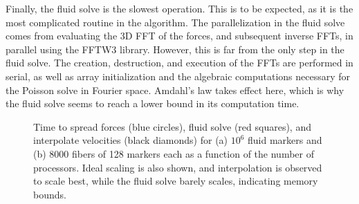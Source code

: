 \documentclass[]{article}
\begin{document}
Finally, the fluid solve is the slowest operation. This is to be expected, as it is the most complicated routine in the algorithm. The parallelization in the fluid solve comes from evaluating the 3D FFT of the forces, and subsequent inverse FFTs, in parallel using the FFTW3 library. However, this is far from the only step in the fluid solve. The creation, destruction, and execution of the FFTs are performed in serial, as well as array initialization and the algebraic computations necessary for the Poisson solve in Fourier space. Amdahl's law takes effect here, which is why the fluid solve seems to reach a lower bound in its computation time. 


\begin{figure}
\centering     
{}
\caption{Time to spread forces (blue circles), fluid solve (red squares), and interpolate velocities (black diamonds) for (a) $10^6$ fluid markers and (b) 8000 fibers of 128 markers each as a function of the number of processors. Ideal scaling is also shown, and interpolation is observed to scale best, while the fluid solve barely scales, indicating memory bounds. }
\label{fig:Strong}
\end{figure}
\end{document}

